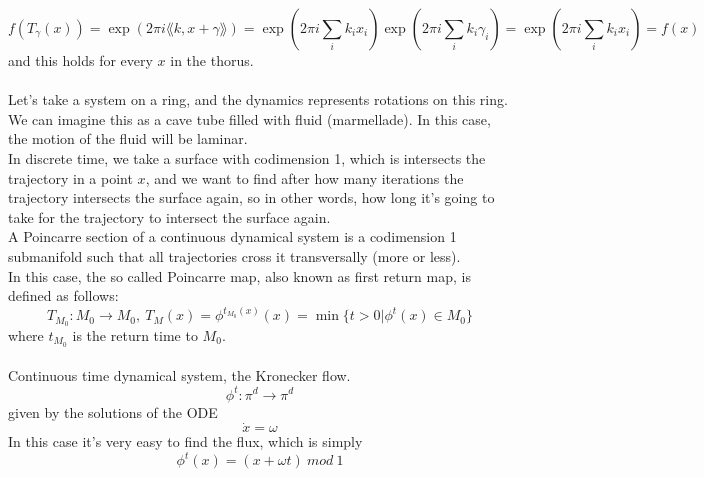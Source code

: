 $$
	f(T_\gamma(x)) = \exp(2\pi i \lang k, x + \gamma \rang) = \exp(2\pi i \sum_i k_ix_i)\exp(2\pi i \sum_i k_i \gamma_i) = \exp(2\pi i \sum_i k_ix_i) = f(x)
$$
and this holds for every $x$ in the thorus. \\ \\
Let's take a system on a ring, and the dynamics represents rotations on this ring. We can imagine this as a cave tube filled with fluid (marmellade). In this case, the motion of the fluid will be laminar. \\
In discrete time, we take a surface with codimension 1, which is intersects the trajectory in a point $x$, and we want to find after how many iterations the trajectory intersects the surface again, so in other words, how long it's going to take for the trajectory to intersect the surface again. \\
A Poincarre section of a continuous dynamical system is a codimension 1 submanifold such that all trajectories cross it transversally (more or less). \\
In this case, the so called Poincarre map, also known as first return map, is defined as follows:
$$
	T_{M_0}: M_0 \rightarrow M_0, \ T_M(x) = \phi^{t_{M_0}(x)}(x) = \min \{t > 0 | \phi^t(x)\in M_0\}
$$
where $t_{M_0}$ is the return time to $M_0$. \\ \\
Continuous time dynamical system, the Kronecker flow.
$$
	\phi^t : \pi^d \rightarrow \pi^d
$$
given by the solutions of the ODE
$$
	\dot{x} = \omega
$$
In this case it's very easy to find the flux, which is simply
$$
	\phi^t(x) =  (x + \omega t) \ mod \ 1
$$













